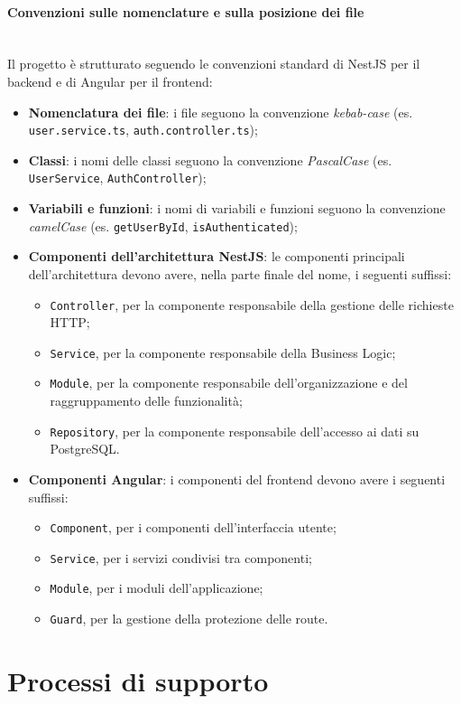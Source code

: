 \documentclass[10pt, letterpaper]{article}
\newcommand{\trisubsection}[1]{\paragraph{#1}\mbox{}\\}
\begin{document}
\trisubsection{Convenzioni sulle nomenclature e sulla posizione dei file}
Il progetto è strutturato seguendo le convenzioni standard di NestJS per il 
backend e di Angular per il frontend:
\begin{itemize}
    \item \textbf{Nomenclatura dei file}: i file seguono la convenzione 
    \textit{kebab-case} (es. \texttt{user.service.ts}, 
    \texttt{auth.controller.ts});
    \item \textbf{Classi}: i nomi delle classi seguono la convenzione 
    \textit{PascalCase} (es. \texttt{UserService}, \texttt{AuthController});
    \item \textbf{Variabili e funzioni}: i nomi di variabili e funzioni 
    seguono la convenzione \textit{camelCase} (es. \texttt{getUserById}, 
    \texttt{isAuthenticated});
    \item \textbf{Componenti dell'architettura NestJS}: le componenti 
    principali dell'architettura devono avere, nella parte finale del nome, 
    i seguenti suffissi:
    \begin{itemize}
        \item \texttt{Controller}, per la componente responsabile della 
        gestione delle richieste HTTP;
        \item \texttt{Service}, per la componente responsabile della 
        Business Logic;
        \item \texttt{Module}, per la componente responsabile 
        dell'organizzazione e del raggruppamento delle funzionalità;
        \item \texttt{Repository}, per la componente responsabile 
        dell'accesso ai dati su PostgreSQL.
    \end{itemize}
    \item \textbf{Componenti Angular}: i componenti del frontend devono 
    avere i seguenti suffissi:
    \begin{itemize}
        \item \texttt{Component}, per i componenti dell'interfaccia utente;
        \item \texttt{Service}, per i servizi condivisi tra componenti;
        \item \texttt{Module}, per i moduli dell'applicazione;
        \item \texttt{Guard}, per la gestione della protezione delle route.
    \end{itemize}
\end{itemize}

\section{Processi di supporto}
\end{document}
